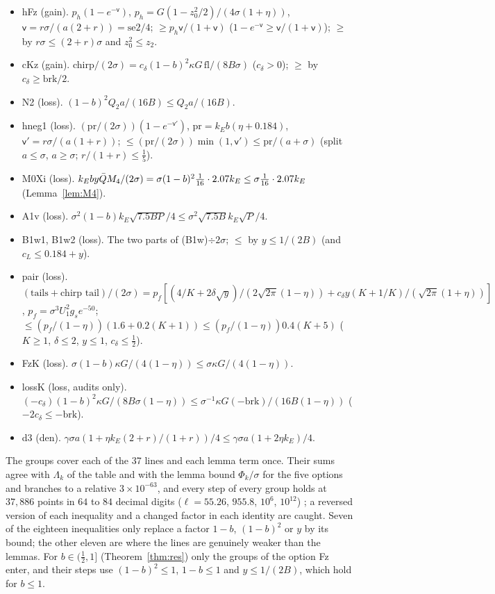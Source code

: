 \begin{itemize}
\item hFz (gain). $p_h(1-e^{-\mathsf v})$, $p_h=G(1-z_0^2/2)/(4\sigma(1+\eta))$, $\mathsf v=r\sigma/(a(2+r))=\mathrm{se2}/4$; $\ge p_h\mathsf v/(1+\mathsf v)$ ($1-e^{-\mathsf v}\ge\mathsf v/(1+\mathsf v)$); $\ge$ by $r\sigma\le(2+r)\sigma$ and $z_0^2\le z_2$.
\item cKz (gain). chirp$/(2\sigma)=c_\delta(1-b)^2\kappa G\,\mathrm{fl}/(8B\sigma)$ ($c_\delta>0$); $\ge$ by $c_\delta\ge\mathrm{brk}/2$.
\item N2 (loss). $(1-b)^2Q_2a/(16B)\le Q_2a/(16B)$.
\item hneg1 (loss). $(\mathrm{pr}/(2\sigma))(1-e^{-\mathsf v'})$, $\mathrm{pr}=k_Eb(\eta+0.184)$, $\mathsf v'=r\sigma/(a(1+r))$; $\le(\mathrm{pr}/(2\sigma))\min(1,\mathsf v')\le\mathrm{pr}/(a+\sigma)$ (split $a\le\sigma$, $a\ge\sigma$; $r/(1+r)\le\frac15$).
\item M0Xi (loss). $k_Eby\bar Q M_4/(2\sigma)=\sigma(1-b)^2\frac1{16}\cdot2.07k_E\le\sigma\frac1{16}\cdot2.07k_E$ (Lemma~\ref{lem:M4}).
\item A1v (loss). $\sigma^2(1-b)k_E\sqrt{7.5BP}/4\le\sigma^2\sqrt{7.5B}k_E\sqrt P/4$.
\item B1w1, B1w2 (loss). The two parts of (B1w)$\div2\sigma$; $\le$ by $y\le1/(2B)$ (and $c_L\le0.184+y$).
\item pair (loss). $(\text{tails}+\text{chirp tail})/(2\sigma)=p_f[(4/K+2\delta\sqrt y)/(2\sqrt{2\pi}(1-\eta))+c_\delta y(K+1/K)/(\sqrt{2\pi}(1+\eta))]$, $p_f=\sigma^3U_1^2g_se^{-50}$; $\le(p_f/(1-\eta))(1.6+0.2(K+1))\le(p_f/(1-\eta))0.4(K+5)$ ($K\ge1$, $\delta\le2$, $y\le1$, $c_\delta\le\frac12$).
\item FzK (loss). $\sigma(1-b)\kappa G/(4(1-\eta))\le\sigma\kappa G/(4(1-\eta))$.
\item lossK (loss, audits only). $(-c_\delta)(1-b)^2\kappa G/(8B\sigma(1-\eta))\le\sigma^{-1}\kappa G(-\mathrm{brk})/(16B(1-\eta))$ ($-2c_\delta\le-\mathrm{brk}$).
\item d3 (den). $\gamma\sigma a(1+\eta k_E(2+r)/(1+r))/4\le\gamma\sigma a(1+2\eta k_E)/4$.
\end{itemize}
The groups cover each of the 37 lines and each lemma term once.
Their sums agree with $\Lambda_k$ of the table and with the lemma bound $\Phi_k/\sigma$ for the five options and branches to a relative $3\times10^{-63}$, and every step of every group holds at $37{,}886$ points in $64$ to $84$ decimal digits ($\ell=55.26$, $955.8$, $10^6$, $10^{12}$) \numst; a reversed version of each inequality and a changed factor in each identity are caught.
Seven of the eighteen inequalities only replace a factor $1-b$, $(1-b)^2$ or $y$ by its bound; the other eleven are where the lines are genuinely weaker than the lemmas.
For $b\in(\frac12,1]$ (Theorem~\ref{thm:res}) only the groups of the option Fz enter, and their steps use $(1-b)^2\le1$, $1-b\le1$ and $y\le1/(2B)$, which hold for $b\le1$.
